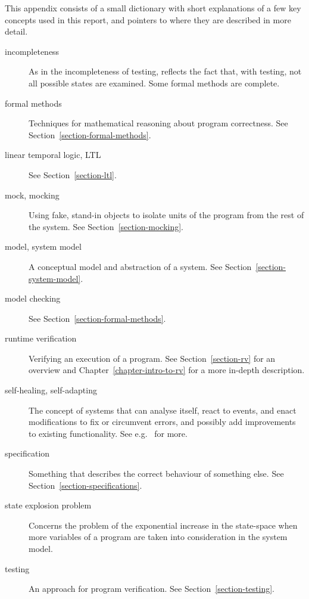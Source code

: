 \documentclass[a4paper,11pt]{kth-mag}
\begin{document}
This appendix consists of a small dictionary with short explanations of a few
key concepts used in this report, and pointers to where they are described in
more detail.

\begin{description}
  \item[incompleteness] As in the incompleteness of testing, reflects the fact
    that, with testing, not all possible states are examined. Some formal
    methods are complete.

  \item[formal methods] Techniques for mathematical reasoning about program
    correctness. See Section~\ref{section-formal-methods}.

  \item[linear temporal logic, LTL] See Section~\ref{section-ltl}.

  \item[mock, mocking] Using fake, stand-in objects to isolate units of the
    program from the rest of the system. See Section~\ref{section-mocking}.

  \item[model, system model] A conceptual model and abstraction of a system.
    See Section~\ref{section-system-model}.

  \item[model checking] See Section~\ref{section-formal-methods}.

  \item[runtime verification] Verifying an execution of a program. See
    Section~\ref{section-rv} for an overview and
    Chapter~\ref{chapter-intro-to-rv} for a more in-depth description.

  \item[self-healing, self-adapting] The concept of systems that can analyse
    itself, react to events, and enact modifications to fix or circumvent
    errors, and possibly add improvements to existing functionality. See e.g.\
    \cite{huebscher08survey} for more.

  \item[specification] Something that describes the correct behaviour of
    something else. See Section~\ref{section-specifications}.

  \item[state explosion problem] Concerns the problem of the exponential
    increase in the state-space when more variables of a program are taken into
    consideration in the system model.

  \item[testing] An approach for program verification. See
    Section~\ref{section-testing}.


\end{description}
\end{document}
